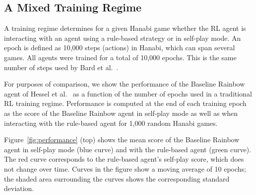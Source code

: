 \documentclass[letterpaper]{article} %
\begin{document}
\subsection{A Mixed Training Regime}
\label{training regimes}
A training regime determines  for a given Hanabi game whether the RL agent  is interacting with  an agent using  a rule-based strategy or in self-play mode. An epoch is defined as 10,000 steps (actions) in Hanabi, which can span several games. All agents were trained for a total of  10,000 epochs.  This is the same number of steps used by Bard et al.~.  




For purposes of comparison,  we  show the performance of the Baseline Rainbow agent of Hessel et al.~ as a function of the number of epochs used in a traditional RL training regime. Performance is computed at the end of each training epoch as the score of the Baseline Rainbow agent in self-play mode as well as  when interacting with the rule-based agent for 1,000 random Hanabi games. 

Figure~\ref{fig:performance} (top) shows the mean score of the Baseline Rainbow agent in self-play mode  (blue curve) and  with the rule-based agent (green curve). The red curve corresponds to the rule-based agent's self-play score, which does not change over time. Curves in the figure show a moving average of 10 epochs;  the  shaded area  surrounding the curves shows the corresponding standard deviation.
\end{document}
